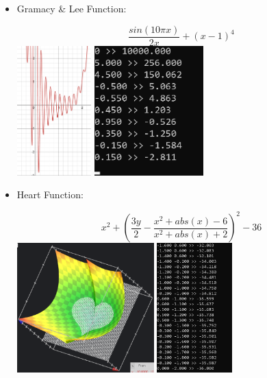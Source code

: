 \documentclass{article}
\begin{document}
\begin{itemize}
  \item
    Gramacy & Lee Function:
    \begin{center}
    $$\frac{sin(10 \pi x)}{2x}+(x-1)^4$$
    \includegraphics[height=5cm]{latex_src/GramacyLee.png}
    \includegraphics[height=5cm]{latex_src/gramacyLeeTest.png}
    \end{center}
  \item
     Heart Function:
    \begin{center}
     $$x^2 + \left( \frac{3y}{2} - \frac{x ^ 2 + abs(x) - 6}{x ^ 2 + abs(x) + 2}\right) ^ 2 - 36$$
    \includegraphics[height=5cm]{latex_src/heart.png}
    \includegraphics[height=5cm]{latex_src/heartTest.png}
    \end{center}
\end{itemize}
\end{document}
